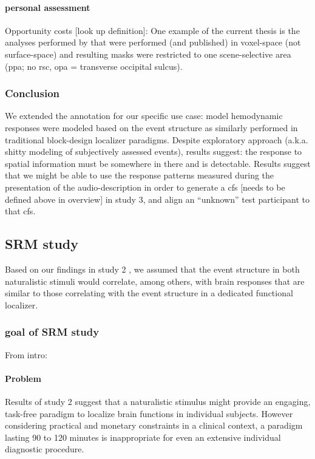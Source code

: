 \paragraph{personal assessment}

%
Opportunity costs [look up definition]: One example of the current thesis is the
analyses performed by \citet{sengupta2016extension} that were performed (and
published) in voxel-space (not surface-space) and resulting masks were
restricted to one scene-selective area (\ac{ppa}; no \ac{rsc}, \ac{opa} =
transverse occipital sulcus).


\subsubsection{Conclusion}
%
We extended the annotation for our specific use case:
%
model hemodynamic responses were modeled based on the event structure as
similarly performed in traditional block-design localizer paradigms.
%
Despite exploratory approach (a.k.a. shitty modeling of subjectively assessed
events), results suggest:
%
the response to spatial information must be somewhere in there and is
detectable.
%
Results suggest that we might be able to use the response patterns
measured during the presentation of the audio-description in order to generate a
\ac{cfs} [needs to be defined above in overview] in study 3, and
align an ``unknown'' test participant to that \ac{cfs}.


\subsection{SRM study}

Based on our findings in study 2 \citep{haeusler2022processing}, we assumed that
the event structure in both naturalistic stimuli would correlate, among others,
with brain responses that are similar to those correlating with the event
structure in a dedicated functional localizer.

\subsubsection{goal of SRM study}

From intro:
\paragraph{Problem}
Results of study 2 suggest that a naturalistic stimulus might provide an
engaging, task-free paradigm to localize brain functions in individual subjects.
%
However considering practical and monetary constraints in a clinical context, a
paradigm lasting 90 to 120 minutes is inappropriate for even an extensive
individual diagnostic procedure.


